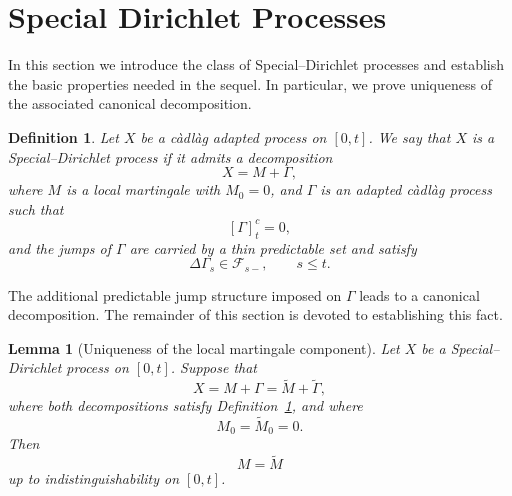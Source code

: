\documentclass[a4paper,10pt]{article}
\newtheorem{lemma}[thm]{Lemma}
\newtheorem{defin}[thm]{Definition}
\begin{document}
\section{Special Dirichlet Processes}\label{sec:special}
In this section we introduce the class of Special--Dirichlet
processes and establish the basic properties needed in the sequel.
In particular, we prove uniqueness of the associated canonical
decomposition.


\begin{defin}\label{DefinSpecial}
Let \(X\) be a càdlàg adapted process on \([0,t]\). We say that \(X\) is a
Special--Dirichlet process if it admits a decomposition
\[
        X = M + \Gamma,
\]
where \(M\) is a local martingale with \(M_0=0\), and \(\Gamma\) is an
adapted càdlàg process such that
\[
        [\Gamma]^c_t = 0,
\]
and the jumps of \(\Gamma\) are carried by a thin predictable set and
satisfy
\[
        \Delta \Gamma_s \in \mathcal{F}_{s-}, \qquad s \le t.
\]
\end{defin}
The additional predictable jump structure imposed on \(\Gamma\)
leads to a canonical decomposition.
The remainder of this section is devoted to establishing this fact.




\begin{lemma}[Uniqueness of the local martingale component]
Let \(X\) be a Special--Dirichlet process on \([0,t]\). Suppose that
\[
        X=M+\Gamma
        =
        \widetilde M+\widetilde\Gamma ,
\]
where both decompositions satisfy Definition~\ref{DefinSpecial}, and
where
\[
        M_0=\widetilde M_0=0 .
\]
Then
\[
        M=\widetilde M
\]
up to indistinguishability on \([0,t]\).
\end{lemma}
\end{document}

